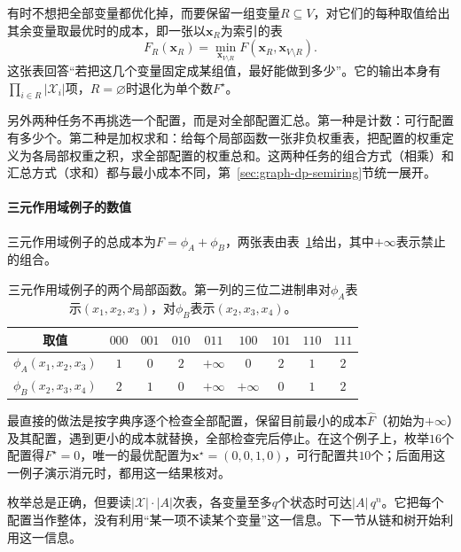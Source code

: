 有时不想把全部变量都优化掉，而要保留一组变量$R\subseteq V$，对它们的每种取值给出其余变量取最优时的成本，即一张以$\bm x_R$为索引的表
\[
F_R(\bm x_R)=\min_{\bm x_{V\setminus R}}F(\bm x_R,\bm x_{V\setminus R}).
\]
这张表回答“若把这几个变量固定成某组值，最好能做到多少”。它的输出本身有$\prod_{i\in R}|\mathcal X_i|$项，$R=\varnothing$时退化为单个数$F^\star$。

另外两种任务不再挑选一个配置，而是对全部配置汇总。第一种是计数：可行配置有多少个。第二种是加权求和：给每个局部函数一张非负权重表，把配置的权重定义为各局部权重之积，求全部配置的权重总和。这两种任务的组合方式（相乘）和汇总方式（求和）都与最小成本不同，第~\ref{sec:graph-dp-semiring}节统一展开。

\paragraph{三元作用域例子的数值}
三元作用域例子的总成本为$F=\phi_A+\phi_B$，两张表由表~\ref{tab:graph-dp-ternary-tables}给出，其中$+\infty$表示禁止的组合。

\begin{table}[!htb]
  \centering
  \begin{tabular}{ccccccccc}
    \toprule
    取值 & $000$ & $001$ & $010$ & $011$ & $100$ & $101$ & $110$ & $111$\\
    \midrule
    $\phi_A(x_1,x_2,x_3)$ & $1$ & $0$ & $2$ & $+\infty$ & $0$ & $2$ & $1$ & $2$\\
    $\phi_B(x_2,x_3,x_4)$ & $2$ & $1$ & $0$ & $+\infty$ & $+\infty$ & $0$ & $1$ & $2$\\
    \bottomrule
  \end{tabular}
  \caption{三元作用域例子的两个局部函数。第一列的三位二进制串对$\phi_A$表示$(x_1,x_2,x_3)$，对$\phi_B$表示$(x_2,x_3,x_4)$。}
  \label{tab:graph-dp-ternary-tables}
\end{table}

最直接的做法是按字典序逐个检查全部配置，保留目前最小的成本$\hat F$（初始为$+\infty$）及其配置，遇到更小的成本就替换，全部检查完后停止。在这个例子上，枚举$16$个配置得$F^\star=0$，唯一的最优配置为$\bm x^\star=(0,0,1,0)$，可行配置共$10$个；后面用这一例子演示消元时，都用这一结果核对。

枚举总是正确，但要读$|\mathcal X|\cdot|A|$次表，各变量至多$q$个状态时可达$|A|\,q^n$。它把每个配置当作整体，没有利用“某一项不读某个变量”这一信息。下一节从链和树开始利用这一信息。
